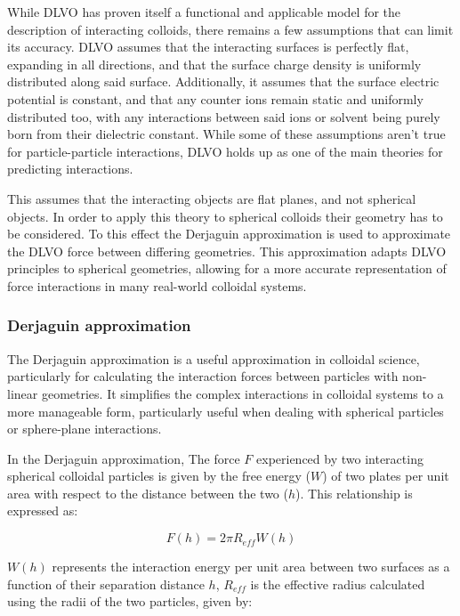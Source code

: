 While DLVO has proven itself a functional and applicable model for the description of interacting colloids, there remains a few assumptions that can limit its accuracy. DLVO assumes that the interacting surfaces is perfectly flat, expanding in all directions, and that the surface charge density is uniformly distributed along said surface. Additionally, it assumes that the surface electric potential is constant, and that any counter ions remain static and uniformly distributed too, with any interactions between said ions or solvent being purely born from their dielectric constant. While some of these assumptions aren't true for particle-particle interactions, DLVO holds up as one of the main theories for predicting interactions. \cite{particledep} \cite{effectHetSurf} \cite{colloidDepKin} \cite{chemDiscCharge} \cite{DLVOreview} 

This assumes that the interacting objects are flat planes, and not spherical objects. In order to apply this theory to spherical colloids their geometry has to be considered. To this effect the Derjaguin approximation is used to approximate the DLVO force between differing geometries. This approximation adapts DLVO principles to spherical geometries, allowing for a more accurate representation of force interactions in many real-world colloidal systems. 

\subsubsection{Derjaguin approximation}

The Derjaguin approximation is a useful approximation in colloidal science, particularly for calculating the interaction forces between particles with non-linear geometries. It simplifies the complex interactions in colloidal systems to a more manageable form, particularly useful when dealing with spherical particles or sphere-plane interactions.

In the Derjaguin approximation, The force $F$ experienced by two interacting spherical colloidal particles is given by the free energy ($W$) of two plates per unit area with respect to the distance between the two ($h$). This relationship is expressed as:

\begin{equation} %
F(h) = 2 \pi R_{eff} W(h)
\end{equation}

$W(h)$ represents the interaction energy per unit area between two surfaces as a function of their separation distance $h$, $R_{eff}$ is the effective radius calculated using the radii of the two particles, given by:

